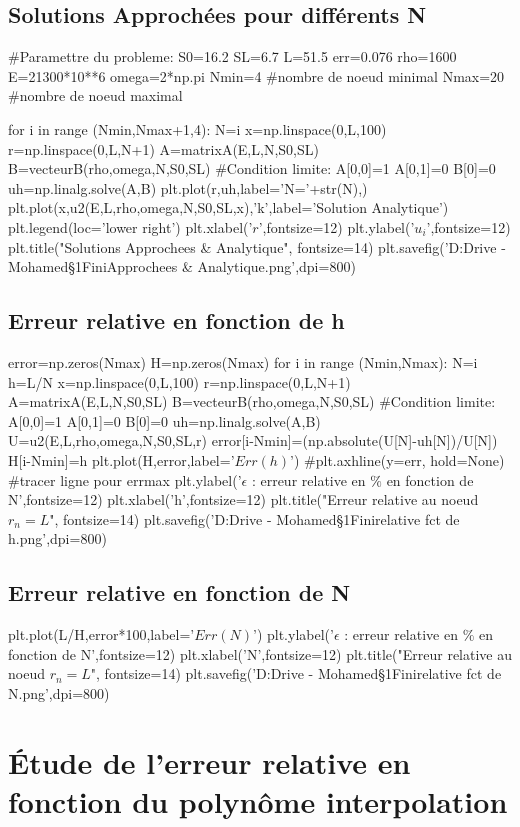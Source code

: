 \documentclass[a4paper,10pt]{report} %
\begin{document}
\subsection{Solutions Approchées pour différents N}
\begin{python}
#Paramettre du probleme:
S0=16.2
SL=6.7
L=51.5
err=0.076
rho=1600
E=21300*10**6
omega=2*np.pi
Nmin=4 #nombre de noeud minimal
Nmax=20 #nombre de noeud maximal

for i in range (Nmin,Nmax+1,4):
    N=i
    x=np.linspace(0,L,100)
    r=np.linspace(0,L,N+1)
    A=matrixA(E,L,N,S0,SL)
    B=vecteurB(rho,omega,N,S0,SL)
    #Condition limite:
    A[0,0]=1
    A[0,1]=0
    B[0]=0
    uh=np.linalg.solve(A,B)
    plt.plot(r,uh,label='N='+str(N),)
plt.plot(x,u2(E,L,rho,omega,N,S0,SL,x),'k',label='Solution Analytique')
plt.legend(loc='lower right')
plt.xlabel('$r$',fontsize=12)
plt.ylabel('$u_{i}$',fontsize=12)
plt.title("Solutions Approchees & Analytique", fontsize=14)
plt.savefig('D:\Google Drive - Mohamed\Cours\S1\Element Fini\Solutions Approchees & Analytique.png',dpi=800)
\end{python}
\subsection{Erreur relative en fonction de h}

\begin{python}
error=np.zeros(Nmax)
H=np.zeros(Nmax)
for i in range (Nmin,Nmax):
    N=i
    h=L/N
    x=np.linspace(0,L,100)
    r=np.linspace(0,L,N+1)
    A=matrixA(E,L,N,S0,SL)
    B=vecteurB(rho,omega,N,S0,SL)
    #Condition limite:
    A[0,0]=1
    A[0,1]=0
    B[0]=0
    uh=np.linalg.solve(A,B)
    U=u2(E,L,rho,omega,N,S0,SL,r)
    error[i-Nmin]=(np.absolute(U[N]-uh[N])/U[N])
    H[i-Nmin]=h
plt.plot(H,error,label='$Err(h)$')
#plt.axhline(y=err, hold=None) #tracer ligne pour errmax
plt.ylabel('$\epsilon$ : erreur relative en $\%$ en fonction de N',fontsize=12)
plt.xlabel('h',fontsize=12)
plt.title("Erreur relative au noeud $r_{n}=L$", fontsize=14)
plt.savefig('D:\Google Drive - Mohamed\Cours\S1\Element Fini\Erreur relative fct de h.png',dpi=800) 
\end{python}
\subsection{Erreur relative en fonction de N}

\begin{python}
plt.plot(L/H,error*100,label='$Err(N)$')
plt.ylabel('$\epsilon$ : erreur relative en $\%$ en fonction de N',fontsize=12)
plt.xlabel('N',fontsize=12)
plt.title("Erreur relative au noeud $r_{n}=L$", fontsize=14)
plt.savefig('D:\Google Drive - Mohamed\Cours\S1\Element Fini\Erreur relative fct de N.png',dpi=800)
\end{python}

\section{Étude de l'erreur relative en fonction du polynôme interpolation}
\begin{python}
\end{python}
\end{document}
